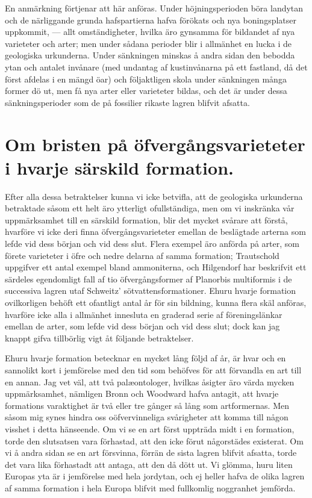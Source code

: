 En anmärkning förtjenar att här anföras. Under höjningsperioden böra landytan och de närliggande grunda hafspartierna hafva förökats och nya boningsplatser uppkommit, — allt omständigheter, hvilka äro gynsamma för bildandet af nya varieteter och arter; men under sådana perioder blir i allmänhet en lucka i de geologiska urkunderna. Under sänkningen minskas å andra sidan den bebodda ytan och antalet invånare (med undantag af kustinvånarna på ett fastland, då det först afdelas i en mängd öar) och följaktligen skola under sänkningen många former dö ut, men få nya arter eller varieteter bildas, och det är under dessa sänkningsperioder som de på fossilier rikaste lagren blifvit afsatta.



\section[Om bristen på öfvergångsvarieteter]{Om bristen på öfvergångsvarieteter i hvarje särskild
formation.}

Efter alla dessa betraktelser kunna vi icke betvifla, att de geologiska urkunderna betraktade såsom ett helt äro ytterligt ofullständiga, men om vi inskränka vår uppmärksamhet till en särskild formation, blir det mycket svårare att förstå, hvarföre vi icke deri finna öfvergångsvarieteter emellan de beslägtade arterna som lefde vid dess början och vid dess slut. Flera exempel äro anförda på arter, som förete varieteter i öfre och nedre delarna af samma formation; Trautschold uppgifver ett antal exempel bland ammoniterna, och Hilgendorf har beskrifvit ett särdeles egendomligt fall af tio öfvergångsformer af Planorbis multiformis i de successiva lagren utaf Schweitz’ sötvattensformationer. Ehuru hvarje formation ovilkorligen behöft ett ofantligt antal år för sin bildning, kunna flera skäl anföras, hvarföre icke alla i allmänhet innesluta en graderad serie af föreningslänkar emellan de arter, som lefde vid dess början och vid dess slut; dock kan jag knappt gifva tillbörlig vigt åt följande betraktelser.

Ehuru hvarje formation betecknar en mycket lång följd af år, är hvar och en sannolikt kort i jemförelse med den tid som behöfves för att förvandla en art till en annan. Jag vet väl, att två palæontologer, hvilkas åsigter äro värda mycken uppmärksamhet, nämligen Bronn och Woodward hafva antagit, att hvarje formations varaktighet är två eller tre gånger så lång som artformernas. Men såsom mig synes hindra oss oöfvervinneliga svårigheter att komma till någon visshet i detta hänseende. Om vi se en art först uppträda midt i en formation, torde den slutsatsen vara förhastad, att den icke förut någorstädes existerat. Om vi å andra sidan se en art försvinna, förrän de sista lagren blifvit afsatta, torde det vara lika förhastadt att antaga, att den då dött ut. Vi glömma, huru liten Europas yta är i jemförelse med hela jordytan, och ej heller hafva de olika lagren af samma formation i hela Europa blifvit med fullkomlig noggranhet jemförda.

